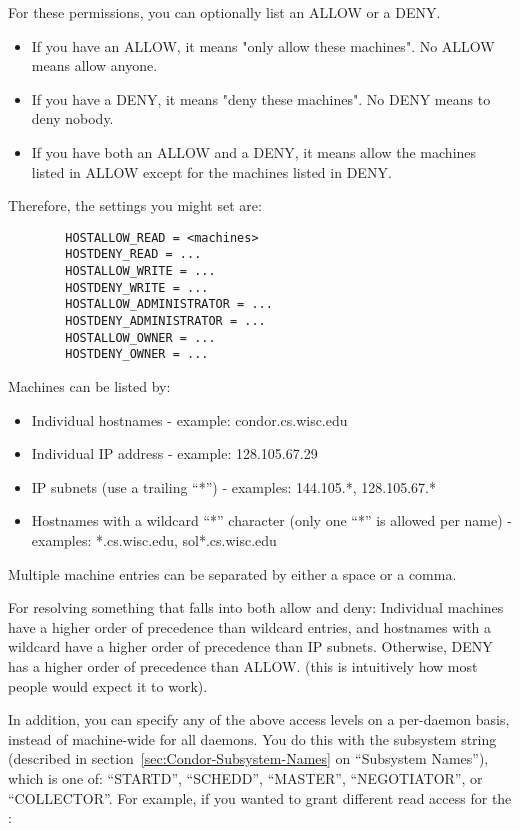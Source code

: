 For these permissions, you can optionally list an ALLOW or a DENY.
\begin{itemize}

\item If you have an ALLOW, it means "only allow these machines".  No
    ALLOW means allow anyone.

\item If you have a DENY, it means "deny these machines".  No DENY
    means to deny nobody.

\item If you have both an ALLOW and a DENY, it means allow the
    machines listed in ALLOW except for the machines listed in DENY.
\end{itemize}

Therefore, the settings you might set are:
\begin{verbatim}
        HOSTALLOW_READ = <machines>
        HOSTDENY_READ = ...
        HOSTALLOW_WRITE = ...
        HOSTDENY_WRITE = ...
        HOSTALLOW_ADMINISTRATOR = ...
        HOSTDENY_ADMINISTRATOR = ...
        HOSTALLOW_OWNER = ...
        HOSTDENY_OWNER = ...
\end{verbatim}

Machines can be listed by:

\begin{itemize}
\item Individual hostnames - example: condor.cs.wisc.edu
\item Individual IP address - example: 128.105.67.29
\item IP subnets (use a trailing ``*'') - examples: 144.105.*, 128.105.67.*
\item Hostnames with a wildcard ``*'' character (only one ``*'' is
    allowed per name) - examples: *.cs.wisc.edu, sol*.cs.wisc.edu
\end{itemize}

Multiple machine entries can be separated by either a space or a comma.

For resolving something that falls into both allow and deny: Individual
machines have a higher order of precedence than wildcard entries, and
hostnames with a wildcard have a higher order of precedence than IP
subnets.  Otherwise, DENY has a higher order of precedence than ALLOW.
(this is intuitively how most people would expect it to work).  

In addition, you can specify any of the above access levels on a
per-daemon basis, instead of machine-wide for all daemons.  You do
this with the subsystem string (described in
section~\ref{sec:Condor-Subsystem-Names} on ``Subsystem Names''),
which is one of: ``STARTD'', ``SCHEDD'', ``MASTER'', ``NEGOTIATOR'',
or ``COLLECTOR''.  For example, if you wanted to grant different read
access for the :

